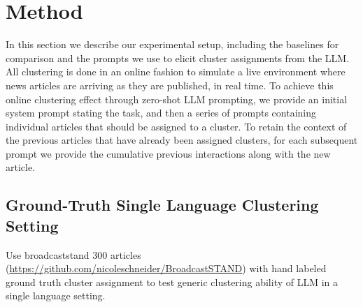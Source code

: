 \section{Method}\label{section:method}

In this section we describe our experimental setup, including the baselines for comparison and the prompts we use to elicit cluster assignments from the LLM.
All clustering is done in an online fashion to simulate a live environment where news articles are arriving as they are published, in real time.
To achieve this online clustering effect through zero-shot LLM prompting, we provide an initial system prompt stating the task, and then a series of prompts containing individual articles that should be assigned to a cluster.
To retain the context of the previous articles that have already been assigned clusters, for each subsequent prompt we provide the cumulative previous interactions along with the new article.



\subsection{Ground-Truth Single Language Clustering Setting}
Use broadcaststand 300 articles (\url{https://github.com/nicoleschneider/BroadcastSTAND}) with hand labeled ground truth cluster assignment to test generic clustering ability of LLM in a single language setting.


